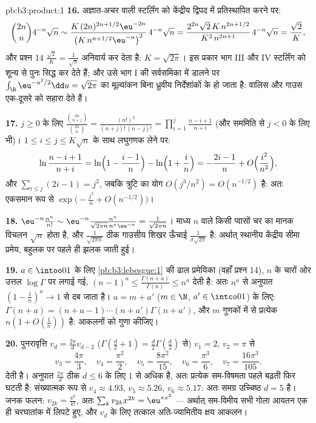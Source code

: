 \begin{solution}{pb:b3:product:1}
\textbf{16.} अज्ञात-अचर वाली स्टर्लिंग को केंद्रीय द्विपद में
प्रतिस्थापित करने पर:
\[
\binom{2n}n4^{-n}\sqrt n \sim
\frac{K\,(2n)^{2n+1/2}\eu^{-2n}}{\bigl(K\,n^{n+1/2}
\eu^{-n}\bigr)^2}\,4^{-n}\sqrt n
= \frac{2^{2n}\sqrt{2}\,K\,n^{2n+1/2}}{K^2\,n^{2n+1}}
\,4^{-n}\sqrt n = \frac{\sqrt2}{K},
\]
और प्रश्न 14 $\frac{\sqrt2}K = \frac1{\sqrt\pi}$ अनिवार्य कर देता है: $K = \sqrt{2\pi}$। इस प्रकार भाग III
और IV स्टर्लिंग को शून्य से पुनः सिद्ध कर देते हैं; और उसे भाग I
की सर्वसमिका में डालने पर $\int_\R\eu^{-u^2/2}\dd u = \sqrt{2\pi}$ का मूल्यांकन बिना ध्रुवीय निर्देशांकों
के हो जाता है: वालिस और गाउस एक-दूसरे को सहारा देते हैं।

\textbf{17.} $j \geq 0$ के लिए $\frac{\binom{2n}{n+j}}{\binom{2n}n} =
\frac{(n!)^2}{(n+j)!\,(n-j)!} =
\prod_{i=1}^{j}\frac{n-i+1}{n+i}$ (और सममिति से $j < 0$ के लिए भी)।
$1 \leq i
\leq j \leq K\sqrt n$ के साथ लघुगणक लेने पर:
\[
\ln\frac{n-i+1}{n+i} = \ln\Bigl(1 - \frac{i-1}n\Bigr) -
\ln\Bigl(1 + \frac in\Bigr) = -\frac{2i-1}{n} +
O\Bigl(\frac{i^2}{n^2}\Bigr),
\]
और $\sum_{i\leq j}(2i - 1) = j^2$, जबकि त्रुटि का योग $O(j^3/n^2) = O(n^{-1/2})$ है: अतः एकसमान रूप से $\exp\bigl(-\frac{j^2}n + O(n^{-1/2})\bigr)$।

\textbf{18.} $\eu^{-n}\frac{n^n}{n!} \sim \eu^{-n}
\frac{n^n}{\sqrt{2\pi n}\,n^n\eu^{-n}} =
\frac1{\sqrt{2\pi n}}$। माध्य $n$ वाले किसी प्वासों चर का मानक विचलन
$\sqrt n$ होता है, और $\frac1{\sqrt{2\pi n}}$ ठीक गाउसीय शिखर ऊँचाई $\frac1{\sigma\sqrt{2\pi}}$ है: अर्थात्
स्थानीय केंद्रीय सीमा प्रमेय, बहुलक पर पहले ही झलक जाती हुई।

\textbf{19.} $a \in \intoo01$ के लिए \cref{pb:b3:lebesgue:1} की ढाल प्रमेयिका (वहाँ प्रश्न 14),
$n$ के चारों ओर उत्तल $\log\Gamma$ पर लगाई गई, $(n-1)^a \leq
\frac{\Gamma(n+a)}{\Gamma(n)} \leq n^a$ देती है: अतः $n^a$
से अनुपात $(1 - \frac1n)^a \to 1$ से दब जाता है। $a = m + a'$ ($m \in \N$, $a' \in \intco01$) के लिए: $\Gamma(n+a) = (n + a - 1)
\cdots(n + a')\Gamma(n + a')$,
और $m$ गुणकों में से प्रत्येक $n(1 + O(\frac1n))$ है: आकलनों को गुणा कीजिए।

\textbf{20.} पुनरावृत्ति $v_d = \frac{2\pi}dv_{d-2}$ ($\Gamma(\frac d2 + 1) = \frac d2\Gamma(\frac d2)$ से) $v_1 = 2$, $v_2 = \pi$ से
\[
v_3 = \frac{4\pi}3,\quad v_4 = \frac{\pi^2}2,\quad
v_5 = \frac{8\pi^2}{15},\quad v_6 = \frac{\pi^3}6,\quad
v_7 = \frac{16\pi^3}{105}.
\]
देती है। अनुपात $\frac{2\pi}d$ ठीक $d \leq 6$ के लिए $1$ से अधिक है, अतः प्रत्येक
सम-विषमता पहले बढ़ती फिर घटती है; संख्यात्मक रूप से $v_4
\approx 4.93$, $v_5 \approx 5.26$,
$v_6 \approx 5.17$: अतः समग्र उच्चिष्ठ $d = 5$ है। जनक फलन: $v_{2k} =
\frac{\pi^k}{k!}$, अतः $\sum_kv_{2k}x^{2k} =
\eu^{\pi x^2}$ ---
अर्थात् सम-विमीय सभी गोला आयतन एक ही चरघातांक में लिपटे हुए, और
$v_d$ के लिए तत्काल अति-ज्यामितीय क्षय आकलन।


\end{solution}
